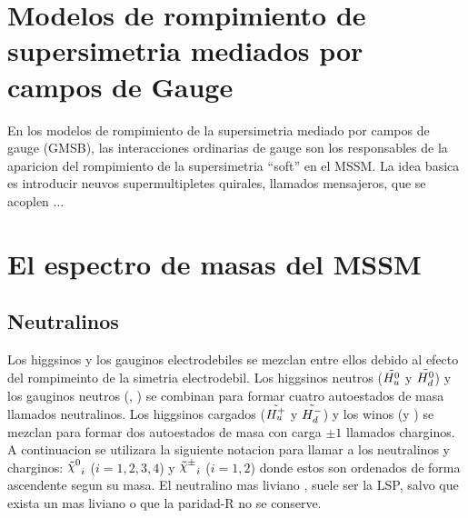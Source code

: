 









\section{Modelos de rompimiento de supersimetria mediados por campos de Gauge}


En los modelos de rompimiento de la supersimetria mediado por campos de gauge (GMSB), las
interacciones ordinarias de gauge son los responsables de la aparicion
del rompimiento de la supersimetria ``soft'' en el MSSM. La idea basica es introducir neuvos
supermultipletes quirales, llamados mensajeros, que se acoplen ...


\section{El espectro de masas del MSSM}

\subsection{Neutralinos}
Los higgsinos y los gauginos electrodebiles se mezclan entre ellos debido al efecto del rompimeinto
de la simetria electrodebil. Los higgsinos neutros ($\tilde{H_u^0}$ y $\tilde{H_d^0}$) y los
gauginos neutros (\bino, \winozero) se combinan para formar cuatro autoestados de masa llamados
neutralinos. Los higgsinos cargados ($\tilde{H_u^+}$ y $\tilde{H_d^-}$) y los winos
(\winop y \winom) se mezclan para formar dos autoestados de masa con carga $\pm 1$ llamados
charginos. A continuacion se utilizara la siguiente notacion para llamar a los neutralinos y charginos:
${\nino}_{i}$ ($i=1,2,3,4$) y ${\chinopm}_{i}$ ($i=1,2$) donde estos son ordenados de forma ascendente segun su
masa. El neutralino mas liviano {\ninoone}, suele ser la LSP, salvo que exista un {\gravino} mas
liviano o que la paridad-R no se conserve.

